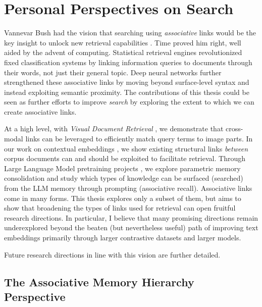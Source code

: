 \setchapterpreamble[u]{\margintoc}
\chapter{Personal Perspectives on Search}

\label{ch:conclusion}

Vannevar Bush had the vision that searching using \emph{associative} links would be the key insight to unlock new retrieval capabilities \cite{bush1945aswemaythink}. Time proved him right, well aided by the advent of computing. Statistical retrieval engines revolutionized fixed classification systems by linking information queries to documents through their words, not just their general topic. Deep neural networks further strengthened these associative links by moving beyond surface-level syntax and instead exploiting semantic proximity. The contributions of this thesis could be seen as further efforts to improve \emph{search} by exploring the extent to which we can create associative links.

At a high level, with \emph{Visual Document Retrieval} , we demonstrate that cross-modal links can be leveraged to efficiently match query terms to image parts. In our work on contextual embeddings , we show existing structural links \emph{between} corpus documents can and should be exploited to facilitate retrieval. Through Large Language Model pretraining projects , we explore parametric memory consolidation and study which types of knowledge can be surfaced (searched) from the LLM memory through prompting (associative recall). Associative links come in many forms. This thesis explores only a subset of them, but aims to show that broadening the types of links used for retrieval can open fruitful research directions. In particular, I believe that many promising directions remain underexplored beyond the beaten (but nevertheless useful) path of improving text embeddings primarily through larger contrastive datasets and larger models.

Future research directions in line with this vision are further detailed.




\section{The Associative Memory Hierarchy Perspective}

